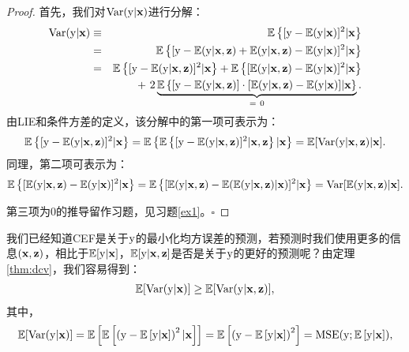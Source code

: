 \documentclass[cn,11pt,chinese]{elegantbook}
\begin{document}
\begin{proof}
首先，我们对${\rm{Var}}({\rm{y}}|\bold{x})$进行分解：
		\begin{eqnarray*}
			{\rm{Var}}({\rm{y}}|\bold{x})&\equiv &\mathbb{E}\left\{[{\rm{y}}-\mathbb{E}({\rm{y}}|\bold{x})]^{2}|\bold{x}\right\}\\
			&=&\mathbb{E}\left\{[{\rm{y}}-\mathbb{E}({\rm{y}}|\bold{x},\bold{z})+\mathbb{E}({\rm{y}}|\bold{x},\bold{z})-\mathbb{E}({\rm{y}}|\bold{x})]^{2}|\bold{x}\right\}\\
			&=&\mathbb{E}\left\{[{\rm{y}}-\mathbb{E}({\rm{y}}|\bold{x},\bold{z})]^{2}|\bold{x}\right\}+\mathbb{E}\left\{[\mathbb{E}({\rm{y}}|\bold{x},\bold{z})-\mathbb{E}({\rm{y}}|\bold{x})]^{2}|\bold{x}\right\}\\
			&& +~2\underbrace{\mathbb{E}\left\{[{\rm{y}}-\mathbb{E}({\rm{y}}|\bold{x},\bold{z})]\cdot[\mathbb{E}({\rm{y}}|\bold{x},\bold{z})-\mathbb{E}({\rm{y}}|\bold{x})]|\bold{x}\right\}}_{=~0}.
		\end{eqnarray*}
		由LIE和条件方差的定义，该分解中的第一项可表示为：
		\begin{eqnarray*}
			\mathbb{E}\left\{[{\rm{y}}-\mathbb{E}({\rm{y}}|\bold{x},\bold{z})]^{2}|\bold{x}\right\}=\mathbb{E}\left\{\mathbb{E}\left\{[{\rm{y}}-\mathbb{E}({\rm{y}}|\bold{x},\bold{z})]^{2}|\bold{x},\bold{z}\right\}|\bold{x}\right\}=\mathbb{E}[{\rm{Var}}({\rm{y}}|\bold{x},\bold{z})|\bold{x}].
		\end{eqnarray*}
		同理，第二项可表示为：
		\begin{eqnarray*}
			\mathbb{E}\left\{[\mathbb{E}({\rm{y}}|\bold{x},\bold{z})-\mathbb{E}({\rm{y}}|\bold{x})]^{2}|\bold{x}\right\}=\mathbb{E}\left\{[\mathbb{E}({\rm{y}}|\bold{x},\bold{z})-\mathbb{E}(\mathbb{E}({\rm{y}}|\bold{x},\bold{z})|\bold{x})]^{2}|\bold{x}\right\}={\rm{Var}}[\mathbb{E}({\rm{y}}|\bold{x},\bold{z})|\bold{x}].
		\end{eqnarray*}
		
		第三项为0的推导留作习题，见习题\ref{ex1}。\hfill$\square$
\end{proof}
我们已经知道CEF是关于$\rm{y}$的最小化均方误差的预测，若预测时我们使用更多的信息$(\bold{x},\bold{z})$，相比于$\mathbb{E}[\rm{y}|\bold{x}]$，$\mathbb{E}[\rm{y}|\bold{x},\bold{z}]$是否是关于$\rm{y}$的更好的预测呢？由定理\ref{thm:dcv}，我们容易得到：
\begin{eqnarray*}
	\mathbb{E}[{\rm{Var}}({\rm{y}}|\bold{x})]\geq \mathbb{E}[{\rm{Var}}({\rm{y}}|\bold{x},\bold{z})],
\end{eqnarray*}
其中，
\begin{eqnarray*}
	\mathbb{E}[{\rm{Var}}({\rm{y}}|\bold{x})]=\mathbb{E}\left[ \mathbb{E}\left[\left(\rm{y}-\mathbb{E}\left[\rm{y}|\bold{x}\right]\right)^{2} |\bold{x}\right]\right]=\mathbb{E}\left[\left(\rm{y}-\mathbb{E}\left[\rm{y}|\bold{x}\right]\right)^{2}\right]=\mathrm{MSE}(\rm{y};\mathbb{E}\left[\rm{y}|\bold{x}\right]),
\end{eqnarray*}
\end{document}

